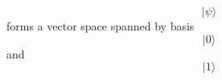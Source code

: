 \documentclass[preview]{standalone}
\begin{document}
\begin{center}
$$ | \psi \rangle$$ forms a vector space spanned by basis $$| 0 \rangle$$ and $$ | 1 \rangle$$
\end{center}
\end{document}
